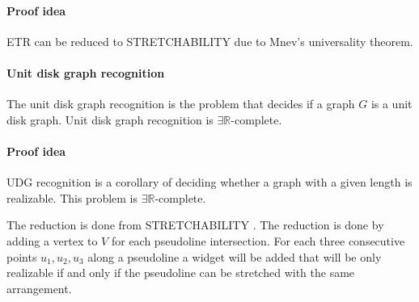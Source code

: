 \paragraph{Proof idea} ETR can be reduced to STRETCHABILITY due to Mnev's
universality theorem. \cite{10.1007/978-3-642-11805-0_32}

\paragraph{Unit disk graph recognition} The unit disk graph recognition is
the problem that decides if a graph $G$ is a unit disk graph. Unit disk graph
recognition is $\exists \mathbb{R}$-complete. \cite{Schaefer2013}

\paragraph{Proof idea} UDG recognition is a corollary of deciding whether a graph
with a given length is realizable. This problem is $\exists \mathbb{R}$-complete.

The reduction is done from STRETCHABILITY \cite{Schaefer2013}. The reduction is
done by adding a vertex to $V$ for each pseudoline intersection. For each three
consecutive points $u_1, u_2, u_3$ along a pseudoline a widget will be added that will
be only realizable if and only if the pseudoline can be stretched with the same
arrangement.
